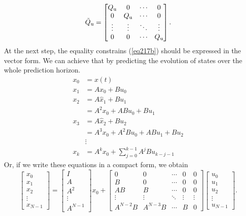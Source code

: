 \begin{equation}
\tilde{Q} _{\text{u}} = \begin{bmatrix}
Q _{\text{u}}&0&\cdots&0\\
0&Q _{\text{u}}&\cdots&0\\
\vdots&\vdots&\ddots&\vdots\\
0&0&\cdots&Q _{\text{u}}
\end{bmatrix}.
\end{equation}
At the next step, the equality constrains (\ref{eq217b}) should be expressed in the vector form. We can achieve that by predicting the evolution of states over the whole prediction horizon.
\begin{equation}
\begin{split}
x_0 &= x(t)\\
x_{1} &= Ax_0 + Bu_0\\
x_{2} &= A\hat{x}_{1} + Bu_{1}\\
&= A^2x_0 + ABu_0 + Bu_{1}\\
x_{3} &= A\hat{x}_{2} + Bu_{2}\\
&= A^3x_0 + A^2Bu_0 + ABu_{1} + Bu_{2}\\
&\vdots\\
x_{k} &= A^kx_0+\sum_{j=0}^{k-1}A^jBu_{k-j-1}
\end{split}
\end{equation}
Or, if we write these equations in a compact form, we obtain
\begin{equation}
	\begin{bmatrix}
	x_0\\x_{1}\\ x_{2}\\\vdots\\ x_{N-1}
	\end{bmatrix} = 
	\begin{bmatrix}I\\A\\A^2\\ \vdots \\ A^{N-1}\end{bmatrix}x_0 + 
	\begin{bmatrix}
	0& 0&\cdots&0&0\\
	B&0&\cdots&0&0\\
	AB&B&\cdots&0&0\\
	\vdots&\vdots&\ddots&\vdots&\vdots\\
	A^{N-2}B&A^{N-3}B&\cdots&B&0\end{bmatrix}
	\begin{bmatrix}u_0\\u_{1}\\u_{2}\\\vdots\\u_{N-1}\end{bmatrix}.
\end{equation}
